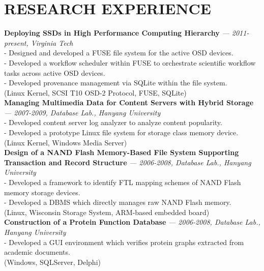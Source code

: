 \section{RESEARCH EXPERIENCE} 
\vspace{0.07in}
  {\bf Deploying SSDs in High Performance Computing Hierarchy}
    {\it \footnotesize --- 2011-present, Virginia Tech} \\
    - Designed and developed a FUSE file system for the active OSD devices.\\
    - Developed a workflow scheduler within FUSE to orchestrate scientific
    workflow tasks across active OSD devices.\\
    - Developed provenance management via SQLite within the file system.\\
    {\footnotesize(Linux Kernel, SCSI T10 OSD-2 Protocol, FUSE, SQLite)}
    \vspace{0.02in}\\
  {\bf Managing Multimedia Data for Content Servers with Hybrid Storage}
    {\it \footnotesize --- 2007-2009, Database Lab., Hanyang University}\\
    - Developed content server log analyzer to analyze content popularity.\\
    - Developed a prototype Linux file system for storage class memory device.\\
    {\footnotesize(Linux Kernel, Windows Media Server)}
    \vspace{0.02in}\\
  {\bf Design of a NAND Flash Memory-Based File System Supporting Transaction and
      Record Structure} 
    {\it \footnotesize --- 2006-2008, Database Lab., Hanyang University}\\
    - Developed a framework to identify FTL mapping schemes of NAND Flash memory
    storage devices.\\
    - Developed a DBMS which directly manages raw NAND Flash memory.\\
    {\footnotesize(Linux, Wisconsin Storage System, ARM-based embedded
     board)}
    \vspace{0.02in}\\
  {\bf Construction of a Protein Function Database} 
    {\it \footnotesize --- 2006-2008, Database Lab., Hanyang University}\\
    - Developed a GUI environment which verifies protein graphs extracted
    from academic documents.\\
    {\footnotesize(Windows, SQLServer, Delphi)}

